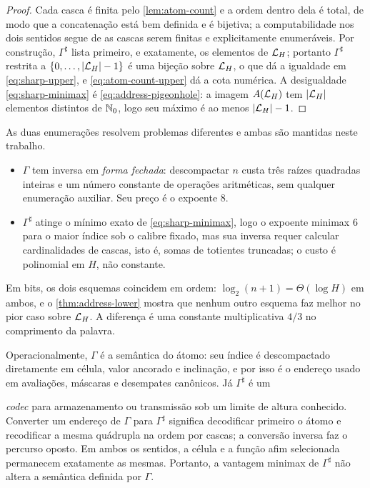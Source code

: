 \begin{proof}
Cada casca é finita pelo \cref{lem:atom-count} e a ordem dentro dela é total, de modo que a concatenação está bem definida e é bijetiva; a computabilidade nos dois sentidos segue de as cascas serem finitas e explicitamente enumeráveis. Por construção, $\Gamma^\sharp$ lista primeiro, e exatamente, os elementos de $\mathcal{L}_H$; portanto $\Gamma^\sharp$ restrita a $\{0,\ldots,|\mathcal{L}_H|-1\}$ é uma bijeção sobre $\mathcal{L}_H$, o que dá a igualdade em \eqref{eq:sharp-upper}, e \eqref{eq:atom-count-upper} dá a cota numérica. A desigualdade \eqref{eq:sharp-minimax} é \eqref{eq:address-pigeonhole}: a imagem $A(\mathcal{L}_H)$ tem $|\mathcal{L}_H|$ elementos distintos de $\mathbb{N}_0$, logo seu máximo é ao menos $|\mathcal{L}_H|-1$.
\end{proof}

\begin{remark}\label{rem:which-address}
As duas enumerações resolvem problemas diferentes e ambas são mantidas neste trabalho.
\begin{itemize}[leftmargin=1.6em]
 \item $\Gamma$ tem inversa em \emph{forma fechada}: descompactar $n$ custa três raízes quadradas inteiras e um número constante de operações aritméticas, sem qualquer enumeração auxiliar. Seu preço é o expoente $8$.
 \item $\Gamma^\sharp$ atinge o mínimo exato de \eqref{eq:sharp-minimax}, logo o expoente minimax $6$ para o maior índice sob o calibre fixado, mas sua inversa requer calcular cardinalidades de cascas, isto é, somas de totientes truncadas; o custo é polinomial em $H$, não constante.
\end{itemize}
Em bits, os dois esquemas coincidem em ordem: $\log_2(n+1)=\Theta(\log H)$ em ambos, e o \cref{thm:address-lower} mostra que nenhum outro esquema faz melhor no pior caso sobre $\mathcal{L}_H$. A diferença é uma constante multiplicativa $4/3$ no comprimento da palavra.
\end{remark}

Operacionalmente, $\Gamma$ é a semântica do átomo: seu índice é descompactado
diretamente em célula, valor ancorado e inclinação, e por isso é o endereço
usado em avaliações, máscaras e desempates canônicos. Já $\Gamma^\sharp$ é um

\emph{codec} para armazenamento ou transmissão sob um limite de altura
conhecido. Converter um endereço de $\Gamma$ para $\Gamma^\sharp$ significa
decodificar primeiro o átomo e recodificar a mesma quádrupla na ordem por
cascas; a conversão inversa faz o percurso oposto. Em ambos os sentidos, a
célula e a função afim selecionada permanecem exatamente as mesmas. Portanto,
a vantagem minimax de $\Gamma^\sharp$ não altera a semântica definida por
$\Gamma$.

